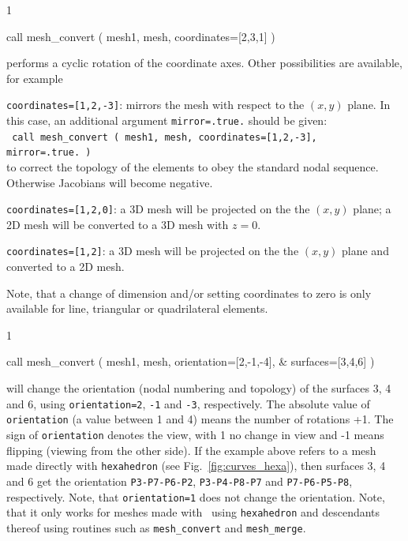 \begin{listing}{1}

  call mesh_convert ( mesh1, mesh, coordinates=[2,3,1] ) 

\end{listing}
performs a cyclic rotation of the coordinate axes. Other possibilities
are available, for example
\begin{description}
   \item{\texttt{coordinates=[1,2,-3]}}: mirrors the mesh with respect to 
the $(x,y)$ plane. In this case, an additional argument \texttt{mirror=.true.} should be given:\\
\hspace*{1mm}\texttt{ call mesh\_convert ( mesh1, mesh, coordinates=[1,2,-3], mirror=.true.\,)}\\
to correct the topology of the elements to obey the standard nodal sequence. Otherwise
Jacobians will become negative.
   \item{\texttt{coordinates=[1,2,0]}}: a 3D mesh will be projected on the 
the $(x,y)$ plane; a 2D mesh will be converted to a 3D mesh with $z=0$.
   \item{\texttt{coordinates=[1,2]}}: a 3D mesh will be projected on the 
the $(x,y)$ plane and converted to a 2D mesh.
\end{description}
Note, that a change of dimension and/or setting coordinates to zero is only
available for line, triangular or quadrilateral elements.
\begin{listing}{1}

  call mesh_convert ( mesh1, mesh, orientation=[2,-1,-4], &
    surfaces=[3,4,6]  ) 

\end{listing}
will change the orientation (nodal numbering and topology) of the surfaces 3, 4 and 6,
using \texttt{orientation=2}, \texttt{-1} and
\texttt{-3}, respectively. The absolute value of \texttt{orientation} (a value between 1 and 4)
means the number of rotations +1. The sign of \texttt{orientation} denotes the view, with
1 no change in view and -1 means flipping (viewing from the other side).
If the example above refers to a mesh made directly with \texttt{hexahedron}
(see Fig.~\ref{fig:curves_hexa}), then surfaces  3, 4 and 6 get the orientation
\texttt{P3-P7-P6-P2}, \texttt{P3-P4-P8-P7} and
\texttt{P7-P6-P5-P8}, respectively.
Note, that \texttt{orientation=1} does not change the orientation.
Note, that it only works for meshes made with \tfem\ using \texttt{hexahedron} and descendants
thereof using routines such as \texttt{mesh\_convert} and \texttt{mesh\_merge}.
